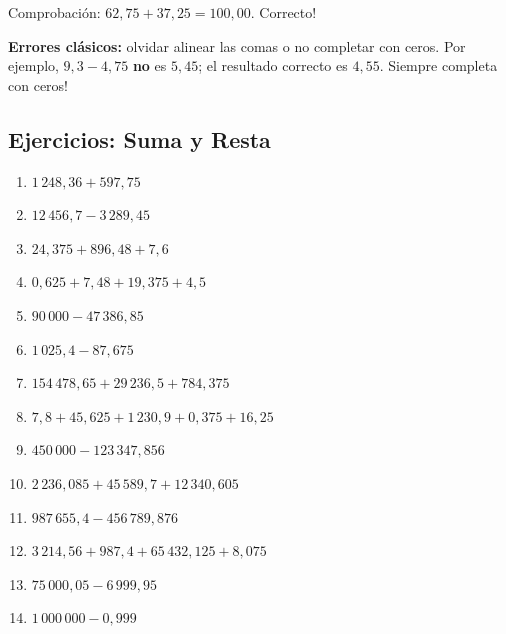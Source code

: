 \documentclass[12pt, letterpaper]{article}
\begin{document}
\noindent Comprobación: $62{,}75 + 37{,}25 = 100{,}00$. \textquestiondown Correcto! \checkmark

\begin{cuadroadvertencia}
  \textbf{Errores clásicos:} olvidar alinear las comas o no completar con ceros. Por ejemplo, $9{,}3 - 4{,}75$ \textbf{no} es $5{,}45$; el resultado correcto es $4{,}55$. \textquestiondown Siempre completa con ceros!
\end{cuadroadvertencia}

\subsection{Ejercicios: Suma y Resta}

\begin{enumerate}[leftmargin=*]
  \item \facil{} $1\,248{,}36 + 597{,}75$

  \item \facil{} $12\,456{,}7 - 3\,289{,}45$

  \item \facil{} $24{,}375 + 896{,}48 + 7{,}6$

  \item \medio{} $0{,}625 + 7{,}48 + 19{,}375 + 4{,}5$

  \item \medio{} $90\,000 - 47\,386{,}85$

  \item \medio{} $1\,025{,}4 - 87{,}675$

  \item \medio{} $154\,478{,}65 + 29\,236{,}5 + 784{,}375$

  \item \medio{} $7{,}8 + 45{,}625 + 1\,230{,}9 + 0{,}375 + 16{,}25$

  \item \dificil{} $450\,000 - 123\,347{,}856$

  \item \dificil{} $2\,236{,}085 + 45\,589{,}7 + 12\,340{,}605$

  \item \dificil{} $987\,655{,}4 - 456\,789{,}876$

  \item \dificil{} $3\,214{,}56 + 987{,}4 + 65\,432{,}125 + 8{,}075$

  \item \dificil{} $75\,000{,}05 - 6\,999{,}95$

  \item \dificil{} $1\,000\,000 - 0{,}999$
\end{enumerate}
\end{document}
